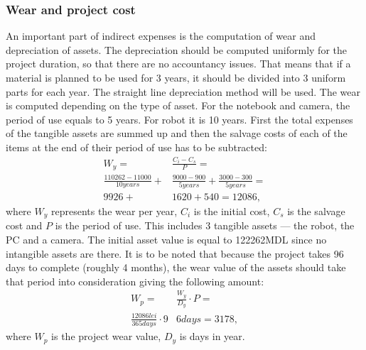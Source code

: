 		\subsubsection{Wear and project cost}

		An important part of indirect expenses is the computation of wear and depreciation of assets. The depreciation should be computed uniformly for the project duration, so that there are no accountancy issues. That means that if a material is planned to be used for 3 years, it should be divided into 3 uniform parts for each year. The straight line depreciation method will be used. The wear is computed depending on the type of asset. For the notebook and camera, the period of use equals to 5 years. For robot it is 10 years. First the total expenses of the tangible assets are summed up and then the salvage costs of each of the items at the end of their period of use has to be subtracted:
      \begin{equation}
      \label{duration}
      \begin{split}
      	W_{y} = &\frac{C_{i} - C_{s}}{P} = \\ \frac{110262 - 11000}{10 years} + &\frac{9000 - 900}{5 years}  + \frac{3000 - 300}{5 years} =\\ 9926 + &1620 + 540 = 12086,
      \end{split}
    \end{equation}
    where \( W_{y}\) represents the wear per year, \( C_{i}\) is the initial cost, \(C_{s}\) is the salvage cost and \( P\) is the period of use.
        This includes 3 tangible assets — the robot, the PC and a camera. The initial asset value is equal to 122262MDL since no intangible assets are there. It is to be noted that because the project takes 96 days to complete (roughly 4 months), the wear value of the assets should take that period into consideration giving the following amount:
      \begin{equation}
      \label{duration}
      \begin{split}
      	W_{p} = &\frac{W_{y}}{D_{y}} \cdot P =\\ \frac{12086lei}{365days} \cdot 9&6days = 3178,
      \end{split}
    \end{equation}
where \( W_{p}\) is the project wear value, \(D_{y}\) is days in year.

